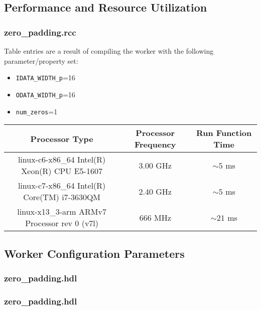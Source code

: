 \documentclass{article}
\def\comp{zero\_padding}
\edef\ecomp{zero_padding}
\begin{document}
\begin{landscape}
\section*{Performance and Resource Utilization}
\subsubsection*{\comp.rcc}
Table entries are a result of compiling the worker with the following parameter/property set:\
\begin{itemize}
	\item \verb+IDATA_WIDTH_p+=16
	\item \verb+ODATA_WIDTH_p+=16
	\item \verb+num_zeros+=1
\end{itemize}
\begin{scriptsize}
	\begin{tabular}{|c|c|c|}
		\hline
		\rowcolor{blue}
		Processor Type                                & Processor Frequency & Run Function Time \\
		\hline
		linux-c6-x86\_64 Intel(R) Xeon(R) CPU E5-1607 & 3.00 GHz            & $\sim5$ ms        \\
		\hline
		linux-c7-x86\_64 Intel(R) Core(TM) i7-3630QM  & 2.40 GHz            & $\sim5$ ms        \\
		\hline
		linux-x13\_3-arm ARMv7 Processor rev 0 (v7l)    & 666 MHz             & $\sim21$ ms       \\
		\hline
	\end{tabular}
\section*{Worker Configuration Parameters}
\subsubsection*{\comp.hdl}
%
\end{scriptsize}
\subsubsection*{\comp.hdl}
%
\end{landscape}
\end{document}
